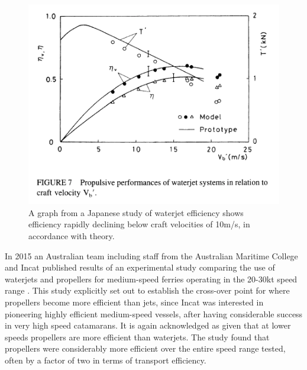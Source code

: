 \documentclass{article}\usepackage[]{graphicx}\usepackage[]{color}
\begin{document}
\begin{figure}
\includegraphics[width=\textwidth]{EfficiencyJapan.png}
\caption{A graph from a Japanese study of waterjet efficiency shows efficiency rapidly declining below craft velocities of 10m/s, in accordance with theory. \parencite{fujisawa1995}}
\label{fig:EfficiencyJapan.png}
\end{figure}

In 2015 an Australian team including staff from the Australian Maritime College and Incat published results of an experimental study comparing the use of waterjets and propellers for medium-speed ferries operating in the 20-30kt speed range \parencite{kamal2015}.  This study explicitly set out to establish the cross-over point for where propellers become more efficient than jets, since Incat was interested in pioneering highly efficient medium-speed vessels, after having considerable success in very high speed catamarans.  It is again acknowledged as given that at lower speeds propellers are more efficient than waterjets.  The study found that propellers were considerably more efficient over the entire speed range tested, often by a factor of two in terms of transport efficiency.
\end{document}
